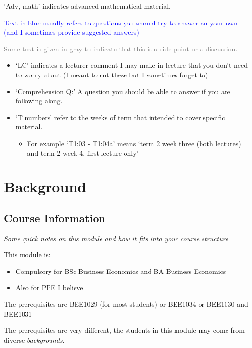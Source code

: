 \documentclass[]{article}
\providecommand{\tightlist}{%
  \setlength{\itemsep}{0pt}\setlength{\parskip}{0pt}}
\begin{document}
\textcolor{RawSienna}{'Adv, math'} indicates advanced mathematical material.

\textcolor{blue}{Text in blue usually  refers to questions you should  try to answer on your own (and I sometimes provide suggested answers)}

\textcolor{gray}{Some text is given in gray  to indicate that this is a side point or a discussion.}

\begin{itemize}
\item
  `LC' indicates a lecturer comment I may make in lecture that you don't need to worry about (I meant to cut these but I sometimes forget to)
\item
  `Comprehension Q:' A question you should be able to answer if you are following along.
\item
  `T numbers' refer to the weeks of term that intended to cover specific material.

  \begin{itemize}
  \tightlist
  \item
    For example `T1:03 - T1:04a' means `term 2 week three (both lectures) and term 2 week 4, first lecture only'
  \end{itemize}
\end{itemize}

\hypertarget{background}{%
\section{Background}\label{background}}

\hypertarget{course-information}{%
\subsection{Course Information}\label{course-information}}

\emph{Some quick notes on this module and how it fits into your course structure}

This module is:

\begin{itemize}
\tightlist
\item
  Compulsory for BSc Business Economics and BA Business Economics
\item
  Also for PPE I believe
\end{itemize}

The prerequisites are BEE1029 (for most students) or BEE1034 or BEE1030 and BEE1031

The prerequisites are very different, the students in this module may come from diverse \emph{backgrounds}.
\end{document}
